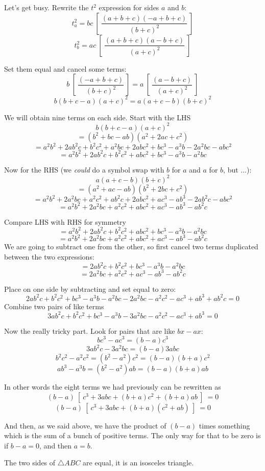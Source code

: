 \documentclass[11pt, oneside]{article}
\begin{document}
Let's get busy.  Rewrite the $t^2$ expression for sides $a$ and $b$:
\[ t_a^2 = bc \ [ \ \frac{(a + b + c)(-a + b + c)}{(b+c)^2} \ ]  \]
\[ t_b^2 = ac \ [ \ \frac{(a + b + c)(a - b + c)}{(a+c)^2} \ ]  \]

Set them equal and cancel some terms:
\[ b \ [ \ \frac{(-a + b + c)}{(b+c)^2} \ ] = a \ [ \ \frac{(a - b + c)}{(a+c)^2} \ ]  \]
\[ b(b + c - a)(a + c)^2 = a(a + c - b)(b+c)^2 \]

We will obtain nine terms on each side.  Start with the LHS
\[ b(b + c - a)(a + c)^2 \]
\[ = (b^2 + bc - ab)(a^2 + 2ac + c^2) \]
\[ = a^2b^2 + 2ab^2c + b^2c^2 + a^2bc + 2abc^2 + bc^3 - a^3b - 2a^2bc - abc^2 \]
\[ = a^2b^2 + 2ab^2c + b^2c^2 + abc^2 + bc^3 - a^3b - a^2bc \]

Now for the RHS (we \emph{could} do a symbol swap with $b$ for $a$ and $a$ for $b$, but ...):
\[ a(a + c - b)(b+c)^2 \]
\[ = ( a^2 + ac - ab)(b^2 + 2bc + c^2) \]
\[ = a^2b^2 + 2a^2bc + a^2c^2 + ab^2c + 2abc^2 + ac^3 - ab^3 - 2ab^2c - abc^2 \]
\[ = a^2b^2 + 2a^2bc + a^2c^2 + abc^2 + ac^3 - ab^3 - ab^2c \]

Compare LHS with RHS for symmetry
\[ = a^2b^2 + 2ab^2c + b^2c^2 + abc^2 + bc^3 - a^3b - a^2bc \]
\[ = a^2b^2 + 2a^2bc + a^2c^2 + abc^2 + ac^3 - ab^3 - ab^2c \]
We are going to subtract one from the other, so first cancel two terms duplicated between the two expressions:
\[ = 2ab^2c + b^2c^2 + bc^3 - a^3b - a^2bc \]
\[ = 2a^2bc + a^2c^2 + ac^3 - ab^3 - ab^2c \]

Place on one side by subtracting and set equal to zero:
\[ 2ab^2c + b^2c^2 + bc^3 - a^3b - a^2bc - 2a^2bc - a^2c^2 - ac^3 + ab^3 + ab^2c = 0 \]
Combine two pairs of like terms
\[ 3ab^2c + b^2c^2 + bc^3 - a^3b - 3a^2bc - a^2c^2 - ac^3 + ab^3 = 0 \]

Now the really tricky part.  Look for pairs that are like $bx-ax$:
\[ bc^3 - ac^3 = (b-a)c^3 \]
\[ 3ab^2c - 3a^2bc = (b-a)3abc \]
\[ b^2c^2 - a^2c^2 = (b^2 - a^2)c^2 = (b-a)(b+a)c^2  \]
\[  ab^3 - a^3b = (b^2 - a^2)ab = (b-a)(b+a)ab \]

In other words the eight terms we had previously can be rewritten as
\[ (b-a) \ [ \ c^3 + 3abc + (b+a)c^2 + (b+a)ab \ ] \ = 0 \]
\[ (b-a) \ [ \ c^3 + 3abc + (b+a)(c^2 + ab) \ ] \ = 0 \]

And then, as we said above, we have the product of $(b-a)$ times something which is the sum of a bunch of positive terms.  The only way for that to be zero is if $b - a = 0$, and then $a = b$.

The two sides of $\triangle ABC$ are equal, it is an isosceles triangle.
\end{document}
